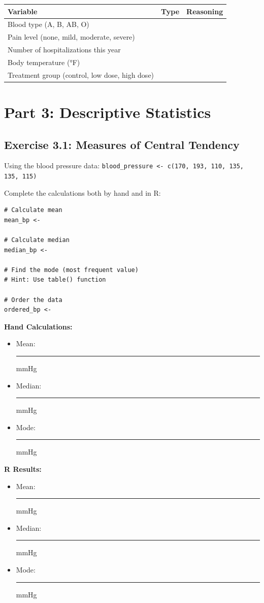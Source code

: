 \documentclass[11pt]{article}
\begin{document}
\begin{center}
\begin{tabular}{|>{\raggedright\arraybackslash}p{4.8cm}|>{\centering\arraybackslash}p{2.2cm}|>{\raggedright\arraybackslash}p{5.5cm}|}
\hline
\textbf{Variable} & \textbf{Type} & \textbf{Reasoning} \\
\hline
Blood type (A, B, AB, O) & & \\[2ex]
\hline
Pain level (none, mild, moderate, severe) & & \\[2ex]
\hline
Number of hospitalizations this year & & \\[2ex]
\hline
Body temperature (°F) & & \\[2ex]
\hline
Treatment group (control, low dose, high dose) & & \\[2ex]
\hline
\end{tabular}
\end{center}

\section{Part 3: Descriptive Statistics}

\subsection{Exercise 3.1: Measures of Central Tendency}
Using the blood pressure data: \texttt{blood\_pressure <- c(170, 193, 110, 135, 135, 115)}

Complete the calculations both by hand and in R:

\begin{lstlisting}
# Calculate mean
mean_bp <-

# Calculate median
median_bp <-

# Find the mode (most frequent value)
# Hint: Use table() function

# Order the data
ordered_bp <-
\end{lstlisting}

\textbf{Hand Calculations:}
\begin{itemize}
\item Mean: \rule{3cm}{0.4pt} mmHg
\item Median: \rule{3cm}{0.4pt} mmHg
\item Mode: \rule{3cm}{0.4pt} mmHg
\end{itemize}

\textbf{R Results:}
\begin{itemize}
\item Mean: \rule{3cm}{0.4pt} mmHg
\item Median: \rule{3cm}{0.4pt} mmHg
\item Mode: \rule{3cm}{0.4pt} mmHg
\end{itemize}
\end{document}
